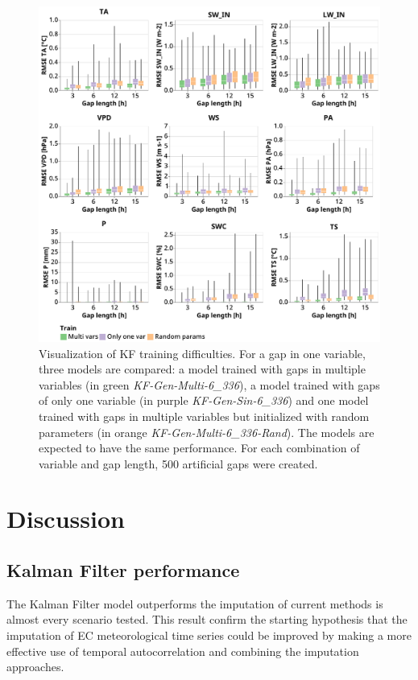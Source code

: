 \documentclass{article}
\newcommand{\imgwidth}{6in}
\let\Oldsection\section
\renewcommand{\section}{\FloatBarrier\Oldsection}
\let\Oldsubsection\subsection
\renewcommand{\subsection}{\FloatBarrier\Oldsubsection}
\begin{document}
\begin{figure}
\centerline{\includegraphics[width=\imgwidth]{train_compare}}
\caption{Visualization of KF training difficulties. For a gap in one variable, three models are compared: a model trained with gaps in multiple variables (in green \textit{KF-Gen-Multi-6\_336}), a model trained with gaps of only one variable (in purple \textit{KF-Gen-Sin-6\_336}) and one model trained with gaps in multiple variables but initialized with random parameters (in orange \textit{KF-Gen-Multi-6\_336-Rand}). The models are expected to have the same performance. For each combination of variable and gap length, 500 artificial gaps were created.}
\label{fig:train_compare}
\end{figure}


\section{Discussion}


\subsection{Kalman Filter performance}

The Kalman Filter model outperforms the imputation of current methods is almost every scenario tested. This result confirm the starting hypothesis that the imputation of EC meteorological time series could be improved by making a more effective use of temporal autocorrelation and combining the imputation approaches.
\end{document}
